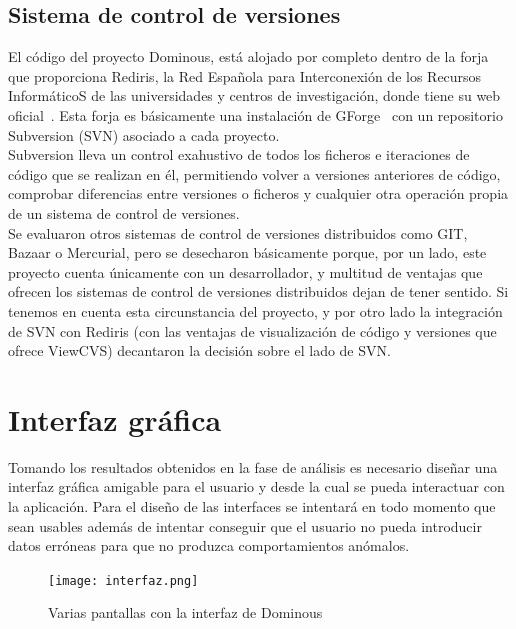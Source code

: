 \subsection{Sistema de control de versiones}

El código del proyecto Dominous, está alojado por completo dentro de
la forja que proporciona Rediris, la Red Española para Interconexión
de los Recursos InformáticoS de las universidades y centros de
investigación, donde tiene su web
oficial~\cite{website:dominous}. Esta forja es básicamente una
instalación de GForge~\cite{website:gforge} con un repositorio
Subversion (SVN) asociado a cada proyecto. \\

Subversion lleva un control exahustivo de todos los ficheros e iteraciones de código que se realizan en él,
permitiendo volver a versiones anteriores de código, comprobar diferencias entre versiones o ficheros y cualquier otra
operación propia de un sistema de control de versiones. \\

Se evaluaron otros sistemas de control de versiones distribuidos como GIT, Bazaar o Mercurial, pero se desecharon
básicamente porque, por un lado, este proyecto cuenta únicamente con un desarrollador, y multitud de ventajas que
ofrecen los sistemas de control de versiones distribuidos dejan de tener sentido. Si tenemos en cuenta esta circunstancia
del proyecto, y por otro lado la integración de SVN con Rediris (con las ventajas de visualización de código y versiones
que ofrece ViewCVS) decantaron la decisión sobre el lado de SVN.

\section{Interfaz gráfica}

Tomando los resultados obtenidos en la fase de análisis es necesario diseñar una interfaz gráfica amigable
para el usuario y desde la cual se pueda interactuar con la aplicación. Para el diseño de las interfaces
se intentará en todo momento que sean usables además de intentar conseguir que el usuario no pueda
introducir datos erróneas para que no produzca comportamientos anómalos. \\

\begin{figure}[h]
  \label{fig:pantallas_interfaz}
  \begin{center}
    \texttt{[image: interfaz.png]}
  \end{center}
  \caption{Varias pantallas con la interfaz de Dominous}
\end{figure}

